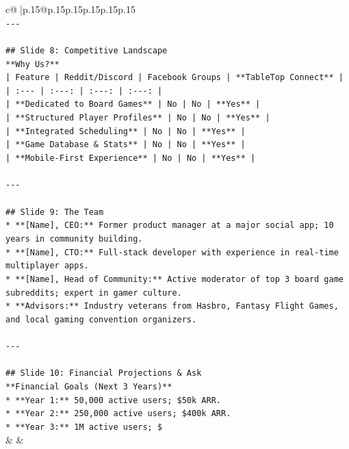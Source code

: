 \documentclass{article}
\begin{document}
{\begin{supertabular}{c@{$\;$}|p{.15\linewidth}@{}p{.15\linewidth}p{.15\linewidth}p{.15\linewidth}p{.15\linewidth}p{.15\linewidth}}
{{{\\ 
\texttt{{-}{-}{-}} \\
\\ 
\texttt{\#\# Slide 8: Competitive Landscape} \\
\texttt{**Why Us?**} \\
\texttt{| Feature | Reddit/Discord | Facebook Groups | **TableTop Connect** |} \\
\texttt{| :{-}{-}{-} | :{-}{-}{-}: | :{-}{-}{-}: | :{-}{-}{-}: |} \\
\texttt{| **Dedicated to Board Games** | No | No | **Yes** |} \\
\texttt{| **Structured Player Profiles** | No | No | **Yes** |} \\
\texttt{| **Integrated Scheduling** | No | No | **Yes** |} \\
\texttt{| **Game Database \& Stats** | No | No | **Yes** |} \\
\texttt{| **Mobile{-}First Experience** | No | No | **Yes** |} \\
\\ 
\texttt{{-}{-}{-}} \\
\\ 
\texttt{\#\# Slide 9: The Team} \\
\texttt{*   **{[}Name{]}, CEO:** Former product manager at a major social app; 10 years in community building.} \\
\texttt{*   **{[}Name{]}, CTO:** Full{-}stack developer with experience in real{-}time multiplayer apps.} \\
\texttt{*   **{[}Name{]}, Head of Community:** Active moderator of top 3 board game subreddits; expert in gamer culture.} \\
\texttt{*   **Advisors:** Industry veterans from Hasbro, Fantasy Flight Games, and local gaming convention organizers.} \\
\\ 
\texttt{{-}{-}{-}} \\
\\ 
\texttt{\#\# Slide 10: Financial Projections \& Ask} \\
\texttt{**Financial Goals (Next 3 Years)**} \\
\texttt{*   **Year 1:** 50,000 active users; \$50k ARR.} \\
\texttt{*   **Year 2:** 250,000 active users; \$400k ARR.} \\
\texttt{*   **Year 3:** 1M active users; \$} \\
            }
        }
    }
    & & \\ \\


\end{supertabular}}
\end{document}
